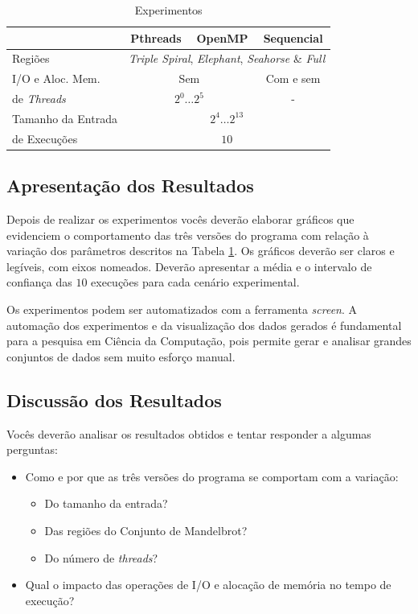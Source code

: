 \documentclass[final,12pt,a4paper]{elsarticle}
\begin{document}
\begin{table}[htpb]
    \centering
    \begin{tabular}{@{}lccc@{}}
        \toprule
        & Pthreads & OpenMP  & Sequencial \\ \midrule
        \addlinespace[0.8em]
        Regiões & \multicolumn{3}{c}{\textit{Triple Spiral}, \textit{Elephant}, \textit{Seahorse} \& \textit{Full}} \\
        \addlinespace[0.8em]
        I/O e Aloc. Mem. & \multicolumn{2}{c}{Sem} & Com e sem \\
        \addlinespace[0.8em]
        \textnumero{} de \textit{Threads} & \multicolumn{2}{c}{$2^0 \dots 2^5$} & -  \\
        \addlinespace[0.8em]
        Tamanho da Entrada & \multicolumn{3}{c}{$2^4 \dots 2^{13}$}\\
        \addlinespace[0.8em]
        \textnumero{} de Execuções & \multicolumn{3}{c}{$10$} \\ \midrule
        \end{tabular}
    \caption{Experimentos}
    \label{tab:exp}
\end{table}

\subsection{Apresentação dos Resultados}

Depois  de  realizar  os  experimentos   vocês  deverão  elaborar  gráficos  que
evidenciem o comportamento  das três versões do programa com  relação à variação
dos parâmetros descritos na Tabela \ref{tab:exp}. Os gráficos deverão ser claros
e legíveis,  com eixos  nomeados. Deverão  apresentar a média  e o  intervalo de
confiança das $10$ execuções para cada cenário experimental.

Os experimentos podem ser automatizados com a ferramenta \textit{screen}. 
A  automação dos  experimentos e da visualização  dos dados  gerados é
fundamental para  a pesquisa  em Ciência  da Computação, pois permite 
gerar e analisar grandes conjuntos de  dados sem muito esforço manual.

\subsection{Discussão dos Resultados}

Vocês deverão analisar os resultados obtidos e tentar responder a algumas
perguntas:

\begin{itemize}
    \item Como e por que as três versões do programa se comportam com a variação:
        \begin{itemize}
            \item Do tamanho da entrada?
            \item Das regiões do Conjunto de Mandelbrot?
            \item Do número de \textit{threads}?
        \end{itemize}
    \item Qual o impacto das operações de I/O e alocação de memória no tempo de
    execução?
\end{itemize}
\end{document}
